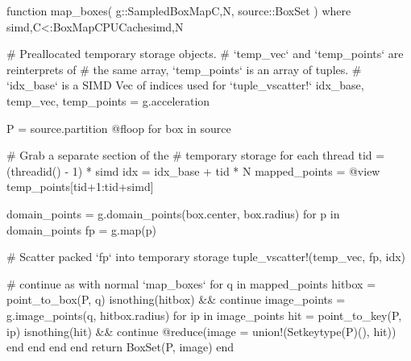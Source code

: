 \begin{jllisting}[float, floatplacement=hb!, language=julia, style=jlcodestyle, label=lst:boxmap_cpu, captionpos=b, caption=Function to calculate $f(\mathcal{B})$ with CPU acceleration]
    function map_boxes(
            g::SampledBoxMap{C,N}, source::BoxSet
        ) where {simd,C<:BoxMapCPUCache{simd},N}
        
        # Preallocated temporary storage objects.
        # `temp_vec` and `temp_points` are reinterprets of
        # the same array, `temp_points` is an array of tuples.
        # `idx_base` is a SIMD Vec of indices used for `tuple_vscatter!`
        idx_base, temp_vec, temp_points = g.acceleration
        
        P = source.partition
        @floop for box in source
        
            # Grab a separate section of the
            # temporary storage for each thread
            tid  = (threadid() - 1) * simd
            idx  = idx_base + tid * N
            mapped_points = @view temp_points[tid+1:tid+simd]
            
            domain_points = g.domain_points(box.center, box.radius)
            for p in domain_points
                fp = g.map(p)

                # Scatter packed `fp` into temporary storage
                tuple_vscatter!(temp_vec, fp, idx)

                # continue as with normal `map_boxes`
                for q in mapped_points
                    hitbox = point_to_box(P, q)
                    isnothing(hitbox) && continue
                    image_points = g.image_points(q,  hitbox.radius)
                    for ip in image_points
                        hit = point_to_key(P, ip)
                        isnothing(hit) && continue
                        @reduce(image = union!(Set{keytype(P)}(), hit))
                    end
                end
            end
        end
        return BoxSet(P, image)
    end
\end{jllisting}

